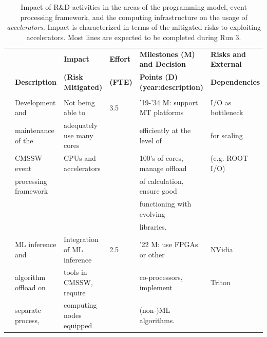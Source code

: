 \documentclass{cmspaper}
\newcommand{\trh}{\cellcolor{tablerowheader}}
\newcounter{magicrownumbers}
\newcommand\rownumber{\refstepcounter{magicrownumbers}\arabic{magicrownumbers}}
\newcommand{\B}[1]{\textbf{#1}}
\newcommand{\UP}[1]{\multirow{-2}{*}{\B{#1}}}
\begin{document}
\begin{table}[ht]
{\footnotesize
\begin{center}
\caption{Impact of R\&D activities in the areas of the programming model, event processing framework, and the computing infrastructure on the usage of \textit{accelerators}. Impact is characterized in terms of the mitigated risks to exploiting accelerators. Most lines are expected to be completed during Run 3.}
\label{tab:acc_fwk}
\begin{tabular}{llllll} 
\hline
\rowcolor{tableheader} &                  & \B{Impact}           & \B{Effort} & \B{Milestones (M) and Decision}  & \B{Risks and External} \\
\rowcolor{tableheader} & \UP{Description} & \B{(Risk Mitigated)} & \B{(FTE)} & \B{Points (D) (year:description)} & \B{Dependencies}       \\
\hline\hline
\rowcolor{tableheader} \multicolumn{6}{c}{\textit{Data Processing Framework and Programming Model}} \\ \hline
\rownumber 
\trh & \trh Development and             & Not being able to          & 3.5 & '19-'34 M: support MT platforms & I/O as bottleneck \\ 
\trh & \trh maintenance of the          & adequately use many cores  &     & efficiently at the level of     & for scaling       \\
\trh & \trh CMSSW event                 & CPUs and accelerators      &     & 100's of cores, manage offload  & (e.g. ROOT I/O)   \\ 
\trh & \trh processing framework        &                            &     & of calculation, ensure good     & \\ 
\trh & \trh                             &                            &     & functioning with evolving       & \\ 
\trh & \trh                             &                            &     & libraries.                      & \\ 
\hline
\rownumber 
\trh & \trh ML inference and            & Integration of ML inference & 2.5 & '22 M: use FPGAs or other          & NVidia \\
\trh & \trh algorithm offload on        & tools in CMSSW, require     &     & co-processors, implement           & Triton \\
\trh & \trh separate process,           & computing nodes equipped    &     & (non-)ML algorithms.               & \\

\end{tabular}
\end{center}}
\end{table}
\end{document}
